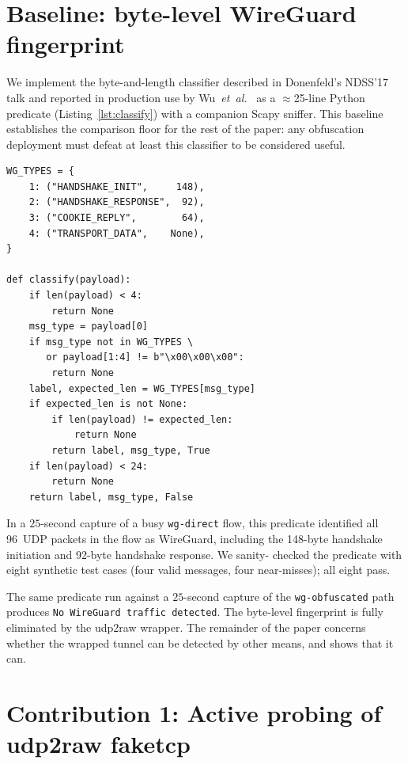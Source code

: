 \documentclass[conference]{IEEEtran}
\begin{document}
\section{Baseline: byte-level WireGuard fingerprint}
\label{sec:trivial-passive}

We implement the byte-and-length classifier described in Donenfeld's
NDSS'17 talk and reported in production use by
Wu~\textit{et~al.}~\cite{wu2023gfw} as a $\approx$25-line Python
predicate (Listing~\ref{lst:classify}) with a companion Scapy sniffer.
This baseline establishes the comparison floor for the rest of the
paper: any obfuscation deployment must defeat at least this classifier
to be considered useful.

\begin{codelisting}[t]
\caption{The complete WireGuard fingerprint predicate.}
\label{lst:classify}
\begin{lstlisting}
WG_TYPES = {
    1: ("HANDSHAKE_INIT",     148),
    2: ("HANDSHAKE_RESPONSE",  92),
    3: ("COOKIE_REPLY",        64),
    4: ("TRANSPORT_DATA",    None),
}

def classify(payload):
    if len(payload) < 4:
        return None
    msg_type = payload[0]
    if msg_type not in WG_TYPES \
       or payload[1:4] != b"\x00\x00\x00":
        return None
    label, expected_len = WG_TYPES[msg_type]
    if expected_len is not None:
        if len(payload) != expected_len:
            return None
        return label, msg_type, True
    if len(payload) < 24:
        return None
    return label, msg_type, False
\end{lstlisting}
\end{codelisting}

In a $25$-second capture of a busy \texttt{wg-direct} flow, this predicate
identified all 96~UDP packets in the flow as WireGuard, including the
148-byte handshake initiation and 92-byte handshake response. We sanity-
checked the predicate with eight synthetic test cases (four valid
messages, four near-misses); all eight pass.

The same predicate run against a $25$-second capture of the
\texttt{wg-obfuscated} path produces \texttt{No WireGuard traffic detected}.
The byte-level fingerprint is fully eliminated by the udp2raw wrapper.
The remainder of the paper concerns whether the wrapped tunnel can be
detected by other means, and shows that it can.

\section{Contribution 1: Active probing of udp2raw faketcp}
\label{sec:c1}
\end{document}
